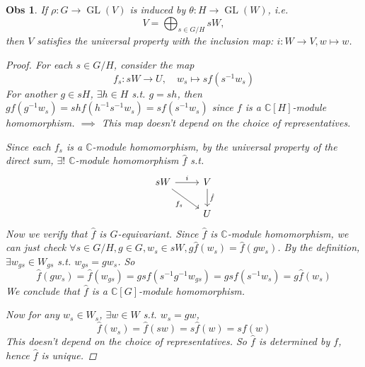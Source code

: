 \documentclass[a4paper]{article}
\newcommand*{\Cb}{\mathbb{C}}
\newcommand*\GL[1]{\operatorname{GL}\mathopen{}\left({#1}\right)\mathclose{}}
\theoremstyle{mystyle}
\newtheorem{observation}{Obs}
\begin{document}
\begin{observation}
  If $\rho: G\to \GL{V}$ is induced by $\theta: H\to \GL{W}$, i.e.
  \[
    V = \bigoplus_{s \in G/H} sW,
  \]
  then $V$ satisfies the universal property with the inclusion map:
  $i: W\to V, w \mapsto w$.
  \begin{proof}
    For each $s \in G/H$, consider the map
    \[
      f_s: sW \to U, \quad w_s \mapsto sf(s^{-1}w_s)
    \]
    For another $g \in sH$, $\exists h \in H$ s.t. $g = sh$, then
    $gf(g^{-1}w_s) = shf(h^{-1}s^{-1}w_s) = sf(s^{-1}w_s)$ since
    $f$ is a $\Cb[H]$-module homomorphism.
    $\implies$ This map doesn't depend on the choice of representatives.

    Since each $f_s$ is a $\Cb$-module homomorphism,
    by the universal property of the direct sum, $\exists!$ $\Cb$-module
    homomorphism $\hat{f}$ s.t.
    \[
      \begin{tikzcd}
        sW \arrow[r, "i"] \arrow[dr, "f_s"'] & V \arrow[d, "\hat{f}"] \\
                                              & U
      \end{tikzcd}
    \]
    Now we verify that $\hat{f}$ is $G$-equivariant.
    Since $\hat{f}$ is $\Cb$-module homomorphism, we can just check
    $\forall s \in G/H, g\in G, w_s \in sW, g\hat{f}(w_s) = \hat{f}(gw_s)$.
    By the definition, $\exists w_{gs} \in W_{gs}$ s.t. $w_{gs} = gw_s$.
    So
    \[
      \hat{f}(gw_s) = \hat{f}(w_{gs})
                    = gsf(s^{-1}g^{-1}w_{gs})
                    = gsf(s^{-1}w_s)
                    = g\hat{f}(w_s)
    \]
    We conclude that $\hat{f}$ is a $\Cb[G]$-module homomorphism.
    
    Now for any $w_s \in W_s$, $\exists w \in W$ s.t. $w_s = gw$,
    \[
      \hat{f}(w_s) = \hat{f}(sw) = s\hat{f}(w) = sf(w)
    \]
    This doesn't depend on the choice of representatives. So $\hat{f}$ is
    determined by $f$, hence $\hat{f}$ is unique.
  \end{proof}
\end{observation}
\end{document}
